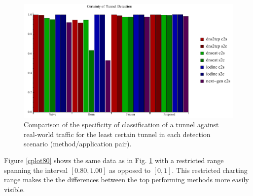 \documentclass{llncs}
\begin{document}
\begin{figure}
\centering
\includegraphics[width=\textwidth]{../figures/cplot.pdf}
\caption[Chart of Specificity of Detection by Tunnel Application and Detection
Method]{Comparison of the specificity of classification of a tunnel against
real-world traffic for the least certain tunnel in each detection scenario
(method/application pair).}
\label{cplot}
\end{figure}



Figure \ref{cplot80} shows the same data as in Fig. \ref{cplot} with a
restricted range spanning the interval $[0.80,1.00]$ as opposed to $[0,1]$. This
restricted charting range makes the the differences between the top performing
methods more easily visible.
\end{document}
